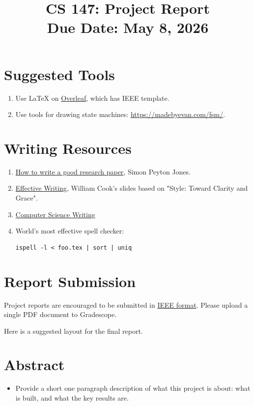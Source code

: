 \documentclass[11pt]{article}
\title{CS 147: Project Report \\ Due Date: May 8, 2026}
\author{}
\date{}
\begin{document}
\frenchspacing
\maketitle

\section*{Suggested Tools}
\begin{enumerate}
\item Use \LaTeX{} on \href{www.overleaf.com}{Overleaf}, which has IEEE template.
\item Use tools for drawing state machines: \url{https://madebyevan.com/fsm/}.
\end{enumerate}

\section*{Writing Resources}
\begin{enumerate}
\item \href{http://research.microsoft.com/Users/simonpj/papers/giving-a-talk/giving-a-talk.htm}{How to write a good research paper}, Simon Peyton Jones.
\item \href{http://www.cs.utexas.edu/~wcook/presentations/Writing.pdf}{Effective Writing}, William Cook's slides based on "Style: Toward Clarity and Grace".
\item \href{http://www.cs.toronto.edu/~miller/Research/writing.html}{Computer Science Writing}
\item World's most effective spell checker:
\begin{verbatim}
ispell -l < foo.tex | sort | uniq
\end{verbatim}
\end{enumerate}


\section*{Report Submission}
Project reports are encouraged to be submitted in \href{http://www.ieee.org/conferences_events/conferences/publishing/templates.html}{IEEE format}.
Please upload a single PDF document to Gradescope.

Here is a suggested layout for the final report.

\section{Abstract}
\begin{itemize}
\item[--] Provide a short one paragraph description of what this project is about: what is built, and what the key results are.
\end{itemize}
\end{document}

